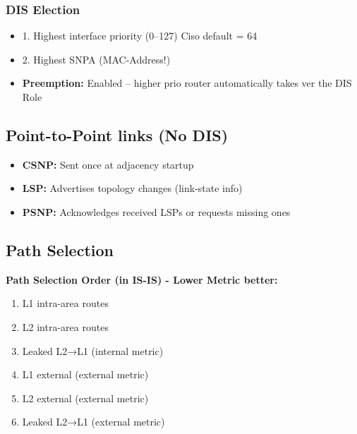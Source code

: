 \begin{multicols*}{5}
		\subsubsection{DIS Election}
		\begin{itemize}
			\item 1. Highest interface priority (0–127) Ciso default = 64
			\item 2. Highest SNPA (MAC-Address!)
			\item \textbf{Preemption:} Enabled – higher prio router automatically takes ver the DIS Role
		\end{itemize}
		\subsection{Point-to-Point links (No DIS)}
		\begin{itemize}
			\item \textbf{CSNP:} Sent once at adjacency startup
			\item \textbf{LSP:} Advertises topology changes (link-state info)
			\item \textbf{PSNP:} Acknowledges received LSPs or requests missing ones
		\end{itemize}
		
		\subsection{Path Selection}
		\textbf{Path Selection Order (in IS-IS) - Lower Metric better:}
		\begin{enumerate}
			\item L1 intra-area routes
			\item L2 intra-area routes
			\item Leaked L2→L1 (internal metric)
			\item L1 external (external metric)
			\item L2 external (external metric)
			\item Leaked L2→L1 (external metric)
		\end{enumerate}

\end{multicols*}
